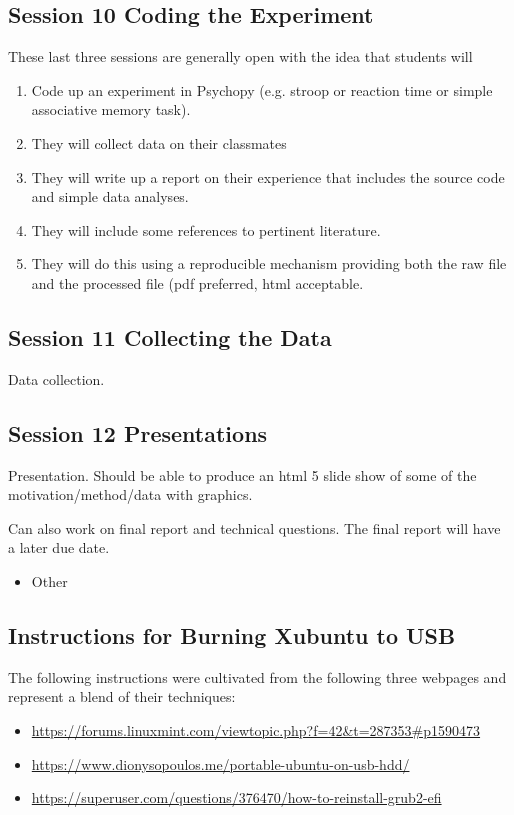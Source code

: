 \documentclass{article}
\begin{document}
\subsection{Session 10 Coding the Experiment}
\label{sec:orge8ee1a9}
These last three sessions are generally open with the idea that students will 
\begin{enumerate}
\item Code up an experiment in Psychopy (e.g. stroop or reaction time or simple associative memory task).
\item They will collect data on their classmates
\item They will write up a report on their experience that includes the source code and simple data analyses.
\item They will include some references to pertinent literature.
\item They will do this using a reproducible mechanism providing both the raw file and the processed file (pdf preferred, html acceptable.
\end{enumerate}
\subsection{Session 11 Collecting the Data}
\label{sec:org302bc12}
Data collection.
\subsection{Session 12 Presentations}
\label{sec:orgee8eb69}
Presentation. Should be able to produce an html 5 slide show of some of the motivation/method/data with graphics.

Can also work on final report and technical questions. The final report will have a later due date. 
\begin{itemize}
\item Other
\end{itemize}
\subsection{Instructions for Burning Xubuntu to USB}
\label{sec:orgc5688be}
The following instructions were cultivated from the following three webpages and represent a blend of their techniques:
\begin{itemize}
\item \url{https://forums.linuxmint.com/viewtopic.php?f=42\&t=287353\#p1590473}
\item \url{https://www.dionysopoulos.me/portable-ubuntu-on-usb-hdd/}
\item \url{https://superuser.com/questions/376470/how-to-reinstall-grub2-efi}
\end{itemize}
\end{document}
